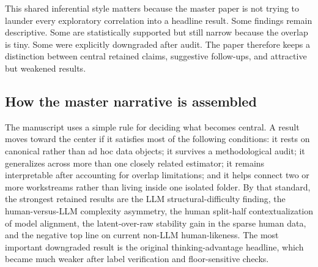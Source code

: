 This shared inferential style matters because the master paper is not trying to launder every exploratory correlation into a headline result. Some findings remain descriptive. Some are statistically supported but still narrow because the overlap is tiny. Some were explicitly downgraded after audit. The paper therefore keeps a distinction between central retained claims, suggestive follow-ups, and attractive but weakened results.

\subsection{How the master narrative is assembled}

The manuscript uses a simple rule for deciding what becomes central. A result moves toward the center if it satisfies most of the following conditions: it rests on canonical rather than ad hoc data objects; it survives a methodological audit; it generalizes across more than one closely related estimator; it remains interpretable after accounting for overlap limitations; and it helps connect two or more workstreams rather than living inside one isolated folder. By that standard, the strongest retained results are the LLM structural-difficulty finding, the human-versus-LLM complexity asymmetry, the human split-half contextualization of model alignment, the latent-over-raw stability gain in the sparse human data, and the negative top line on current non-LLM human-likeness. The most important downgraded result is the original thinking-advantage headline, which became much weaker after label verification and floor-sensitive checks.
